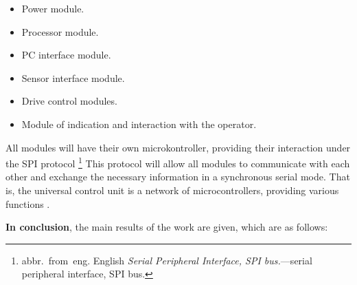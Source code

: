 \begin{itemize}
\item Power module.
\item Processor module.
\item PC interface module.
\item Sensor interface module.
\item Drive control modules.
\item Module of indication and interaction with the operator.
\end{itemize}

All modules will have their own microkontroller, providing their interaction under the SPI protocol \footnote{abbr.~from~eng. English \textit{Serial Peripheral Interface, SPI bus.}---serial peripheral interface, SPI bus.} This protocol will allow all modules to communicate with each other and exchange the necessary information in a synchronous serial mode. That is, the universal control unit is a network of microcontrollers, providing various functions .

\FloatBarrier                      
\textbf{In conclusion}, the main results of the work are given, which are as follows:


